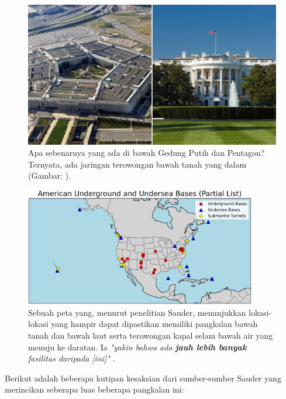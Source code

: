 \documentclass[10pt,twocolumn,letterpaper]{article}
\begin{document}
\begin{figure}[b]
\begin{center}
   \includegraphics[width=1\linewidth]{penta.jpg}
\end{center}
   \caption{Apa sebenarnya yang ada di bawah Gedung Putih dan Pentagon? Ternyata, ada jaringan terowongan bawah tanah yang dalam (Gambar: \cite{31}).}
\label{fig:3}
\label{fig:onecol}
\end{figure}
\begin{figure}[t]
\begin{center}
\includegraphics[width=0.9\textwidth]{basescrop.png}
\end{center}
   \caption{Sebuah peta yang, menurut penelitian Sauder, menunjukkan lokasi-lokasi yang hampir dapat dipastikan memiliki pangkalan bawah tanah dan bawah laut serta terowongan kapal selam bawah air yang menuju ke daratan. Ia \textit{"yakin bahwa ada \textbf{jauh lebih banyak} fasilitas daripada [ini]"} \cite{22}.}
   \label{fig:4}
\end{figure}

Berikut adalah beberapa kutipan kesaksian dari sumber-sumber Sauder yang merincikan seberapa luas beberapa pangkalan ini:
\end{document}
